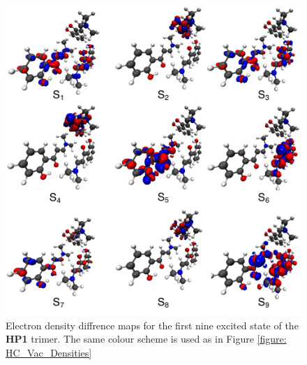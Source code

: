 \begin{figure}[t]
\centering
  \includegraphics[width=0.8\linewidth]{5ConnectingCrystalStructure/trimer_excitations}
  \caption[Electron density diffrence maps for the first nine excited state of the \textbf{HP1} trimer.]{Electron density diffrence maps for the first nine excited state of the \textbf{HP1} trimer. The same colour scheme is used as in Figure \ref{figure: HC_Vac_Densities}}
  \label{figure: trimer_excitations}
\end{figure} 

